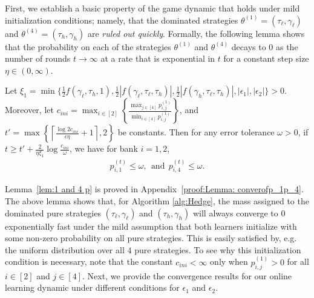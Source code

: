 First, we establish a basic property of the game dynamic that holds under mild initialization conditions; namely, that the dominated strategies $\theta^{(1)} = (\tau_{\ell},\gamma_{\ell})$ and $\theta^{(4)} = (\tau_h, \gamma_h)$ are \emph{ruled out quickly}.
Formally, the following lemma shows that the probability on each of the strategies $\theta^{(1)}$ and $\theta^{(4)}$ decays to $0$ as the number of rounds $t \to \infty$ at a rate that is exponential in $t$ for a constant step size $\eta \in (0,\infty)$.
\begin{lemma}
\label{lem:1 and 4 p}
Let $\xi_1=\min\{\frac{1}{2}f(\gamma_{\ell},\tau_{h},1), \frac{1}{2}\left|f(\gamma_{\ell},\tau_{\ell},\tau_{h})\right|,\frac{1}{2}|f(\gamma_{h},\tau_{\ell},\tau_{h})|, |\epsilon_1|, |\epsilon_2|\}>0.$ Moreover, let $c_{ini}=\max_{i\in[2]}\left\{\frac{\max_{j\in[4]}p^{(1)}_{i,j}}{\min_{i\in[4]}p^{(1)}_{i,j}}\right\}$, and $t'=\max\left\{\left\lceil\frac{\log 2c_{ini}}{\epsilon\eta}+1\right\rceil,2\right\}$ be constants. Then for any error tolerance $\omega>0$, if $t\geq t'+\frac{2}{\eta\xi_1} \log\frac{c_{ini}}{\omega}$, we have for bank $i=1,2$, 
\begin{equation*}
    \begin{split}
        {p^{(t)}_{i,1}}\leq \omega,\ \ \text{and}
\ \ p^{(t)}_{i,4}\leq \omega.
    \end{split}
\end{equation*}
\end{lemma}
Lemma~\ref{lem:1 and 4 p} is proved in Appendix~\ref{proof:Lemma: converofp_1p_4}. %
The above lemma shows that, for Algorithm \ref{alg:Hedge}, the mass assigned to the dominated pure strategies $(\tau_{\ell},\gamma_{\ell})$ and $(\tau_{h},\gamma_{h})$ will always converge to 0 exponentially fast under the mild assumption that both learners initialize with some non-zero probability on all pure strategies. This is easily satisfied by, e.g. the uniform distribution over all $4$ pure strategies. To see why this initialization condition is necessary, note that the constant $c_{ini} < \infty$ only when $p_{i,j}^{(1)} > 0$ for all $i \in [2]$ and $j \in [4]$. %
Next, we provide the convergence results for our online learning dynamic under different conditions for $\epsilon_1$ and $\epsilon_2$.\\

